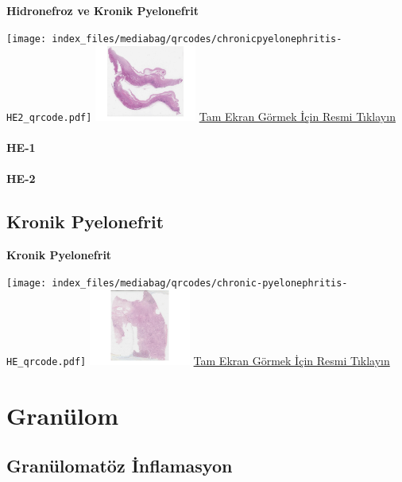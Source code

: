 \documentclass[
  letterpaper,
  DIV=11,
  numbers=noendperiod]{scrreprt}
\begin{document}
\textbf{Hidronefroz ve Kronik Pyelonefrit}

\texttt{[image: index\_files/mediabag/qrcodes/chronicpyelonephritis-HE2\_qrcode.pdf]}
\href{https://images.patolojiatlasi.com/chronicpyelonephritis/HE2.html}{\includegraphics[width=0.25\textwidth,height=\textheight]{./screenshots/thumbnail_chronicpyelonephritis-2.png}}
\href{https://images.patolojiatlasi.com/chronicpyelonephritis/HE2.html}{Tam
Ekran Görmek İçin Resmi Tıklayın}

\subsubsection{HE-1}\label{he-1-3}

\subsubsection{HE-2}\label{he-2-3}

\section{Kronik Pyelonefrit}\label{sec-kronik-pyelonefrit}

\textbf{Kronik Pyelonefrit}

\texttt{[image: index\_files/mediabag/qrcodes/chronic-pyelonephritis-HE\_qrcode.pdf]}
\href{https://images.patolojiatlasi.com/chronic-pyelonephritis/HE.html}{\includegraphics[width=0.25\textwidth,height=\textheight]{./screenshots/thumbnail_chronic-pyelonephritis.png}}
\href{https://images.patolojiatlasi.com/chronic-pyelonephritis/HE.html}{Tam
Ekran Görmek İçin Resmi Tıklayın}

\chapter{Granülom}\label{sec-granulom}

\section{Granülomatöz İnflamasyon}\label{sec-granulomatoz-inflamasyon}
\end{document}
